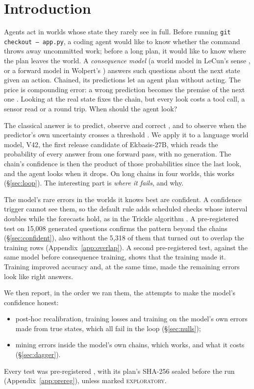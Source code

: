 \documentclass[11pt]{article}
\newcommand{\explo}{\textsc{exploratory}}
\begin{document}
\section{Introduction}
Agents act in worlds whose state they rarely see in full. Before running \texttt{git checkout -- app.py}, a coding agent
would like to know whether the command throws away uncommitted work; before a long plan, it would like to know where
the plan leaves the world. A \emph{consequence model} (a world model in LeCun's sense \cite{lecun2022}, or a forward
model in Wolpert's \cite{wolpert1995}) answers such questions about the next state given an action. Chained, its
predictions let an agent plan without acting. The price is compounding error: a wrong prediction becomes the premise of
the next one \cite{talvitie2014,janner2019}. Looking at the real state fixes the chain, but every look costs a tool
call, a sensor read or a round trip. When should the agent look?

The classical answer is to predict, observe and correct \cite{kalman1960}, and to observe when the predictor's own
uncertainty crosses a threshold \cite{trimpe2014,holt2023}. We apply it to a language world model, V42, the first release candidate of Ekbasis-27B,
which reads the probability of every answer from one forward pass, with no generation. The chain's confidence is then the
product of those probabilities since the last look, and the agent looks when it drops. On long chains in four worlds,
this works (\S\ref{sec:loop}). The interesting part is \emph{where it fails}, and why.

The model's rare errors in the worlds it knows best are confident. A confidence trigger cannot see them, so the default
rule adds scheduled checks whose interval doubles while the forecasts hold, as in the Trickle algorithm
\cite{rfc6206}. A pre-registered test on 15,008 generated questions confirms the pattern beyond the chains
(\S\ref{sec:confident}), also without the 5,318 of them that turned out to overlap the training rows
(Appendix~\ref{app:overlap}). A second pre-registered test, against the same model before consequence training, shows that
the training made it. Training improved accuracy and, at the same time, made the remaining errors look like right
answers.

We then report, in the order we ran them, the attempts to make the model's confidence honest:
\begin{itemize}
  \item post-hoc recalibration, training losses and training on the model's own errors made from true states, which
  all fail in the loop (\S\ref{sec:nulls});
  \item mining errors inside the model's own chains, which works, and what it costs (\S\ref{sec:dagger}).
\end{itemize}
Every test was pre-registered \cite{nosek2018}, with its plan's SHA-256 sealed before the run
(Appendix~\ref{app:prereg}), unless marked \explo.
\end{document}
